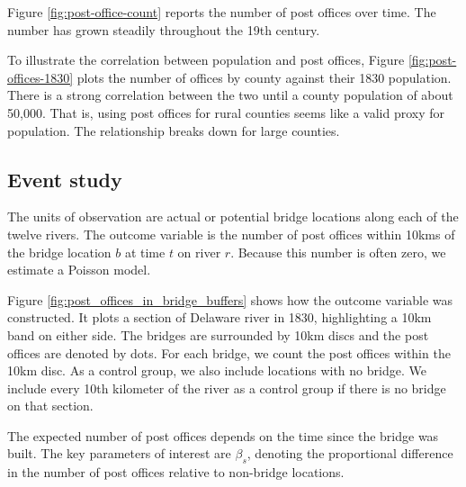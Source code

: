 Figure \ref{fig:post-office-count} reports the number of post offices over time. The number has grown steadily throughout the 19th century. 


To illustrate the correlation between population and post offices, Figure \ref{fig:post-offices-1830} plots the number of offices by county against their 1830 population. There is a strong correlation between the two until a county population of about 50,000. That is, using post offices for rural counties seems like a valid proxy for population. The relationship breaks down for large counties.



\subsection{Event study}
The units of observation are actual or potential bridge locations along each of the twelve rivers. The outcome variable is the number of post offices within 10kms of the bridge location $b$ at time $t$ on river $r$. Because this number is often zero, we estimate a Poisson model.

Figure \ref{fig:post_offices_in_bridge_buffers} shows how the outcome variable was constructed. It plots a section of Delaware river in 1830, highlighting a 10km band on either side. The bridges are surrounded by 10km discs and the post offices are denoted by dots. For each bridge, we count the post offices within the 10km disc.
As a control group, we also include locations with no bridge. We include every 10th kilometer of the river as a control group if there is no bridge on that section.


The expected number of post offices depends on the time since the bridge was built. The key parameters of interest are $\beta_s$, denoting the proportional difference in the number of post offices relative to non-bridge locations.

